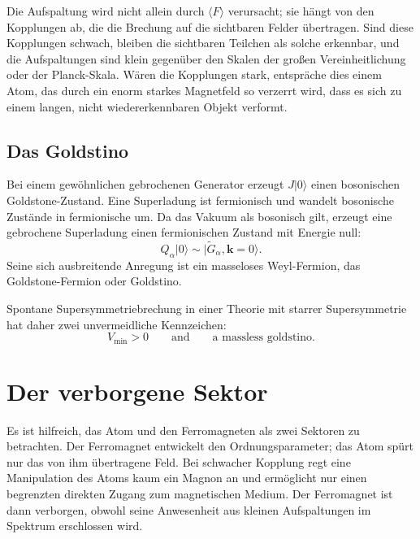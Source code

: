 Die Aufspaltung wird nicht allein durch \(\langle F\rangle\) verursacht; sie hängt von den Kopplungen ab, die die Brechung auf die sichtbaren Felder übertragen. Sind diese Kopplungen schwach, bleiben die sichtbaren Teilchen als solche erkennbar, und die Aufspaltungen sind klein gegenüber den Skalen der großen Vereinheitlichung oder der Planck-Skala. Wären die Kopplungen stark, entspräche dies einem Atom, das durch ein enorm starkes Magnetfeld so verzerrt wird, dass es sich zu einem langen, nicht wiedererkennbaren Objekt verformt.

\subsection{Das Goldstino}

Bei einem gewöhnlichen gebrochenen Generator erzeugt \(J|0\rangle\) einen bosonischen Goldstone-Zustand. Eine Superladung ist fermionisch und wandelt bosonische Zustände in fermionische um. Da das Vakuum als bosonisch gilt, erzeugt eine gebrochene Superladung einen fermionischen Zustand mit Energie null:
\begin{equation}
Q_\alpha|0\rangle
\sim
|\widetilde G_\alpha,\mathbf k=0\rangle.
\label{eq:l9-goldstino}
\end{equation}
Seine sich ausbreitende Anregung ist ein masseloses Weyl-Fermion, das Goldstone-Fermion oder Goldstino.

\begin{classroomqa}
\end{classroomqa}

Spontane Supersymmetriebrechung in einer Theorie mit starrer Supersymmetrie hat daher zwei unvermeidliche Kennzeichen:
\begin{equation}
\boxed{
V_{\min}>0
\qquad\text{and}\qquad
\text{a massless goldstino}.
}
\label{eq:l9-rigid-breaking-signatures}
\end{equation}

\section{Der verborgene Sektor}

Es ist hilfreich, das Atom und den Ferromagneten als zwei Sektoren zu betrachten. Der Ferromagnet entwickelt den Ordnungsparameter; das Atom spürt nur das von ihm übertragene Feld. Bei schwacher Kopplung regt eine Manipulation des Atoms kaum ein Magnon an und ermöglicht nur einen begrenzten direkten Zugang zum magnetischen Medium. Der Ferromagnet ist dann verborgen, obwohl seine Anwesenheit aus kleinen Aufspaltungen im Spektrum erschlossen wird.

